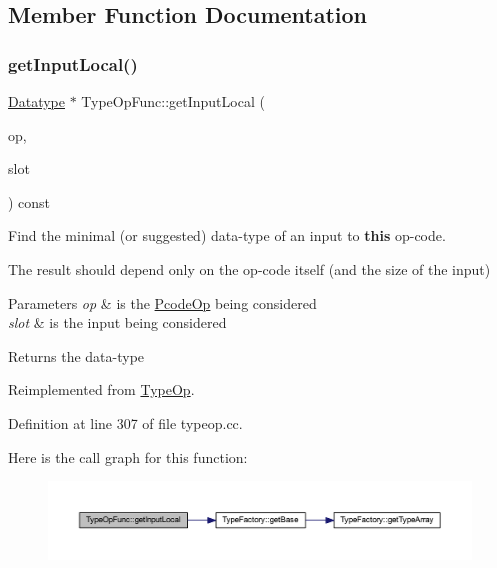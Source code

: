 \subsection{Member Function Documentation}
\mbox{\label{class_type_op_func_a7f2860d7c345a794c665f72dbc41c44d}} 
\subsubsection{\texorpdfstring{getInputLocal()}{getInputLocal()}}
{\footnotesize\ttfamily \mbox{\hyperlink{class_datatype}{Datatype}} $\ast$ Type\+Op\+Func\+::get\+Input\+Local (\begin{DoxyParamCaption}\item[{const \mbox{\hyperlink{class_pcode_op}{Pcode\+Op}} $\ast$}]{op,  }\item[{int4}]{slot }\end{DoxyParamCaption}) const\hspace{0.3cm}{\ttfamily [virtual]}}



Find the minimal (or suggested) data-\/type of an input to {\bfseries{this}} op-\/code. 

The result should depend only on the op-\/code itself (and the size of the input) 
\begin{DoxyParams}{Parameters}
{\em op} & is the \mbox{\hyperlink{class_pcode_op}{Pcode\+Op}} being considered \\
\hline
{\em slot} & is the input being considered \\
\hline
\end{DoxyParams}
\begin{DoxyReturn}{Returns}
the data-\/type 
\end{DoxyReturn}


Reimplemented from \mbox{\hyperlink{class_type_op_abe2e4b619932cf94bafb084963a0fc66}{Type\+Op}}.



Definition at line 307 of file typeop.\+cc.

Here is the call graph for this function\+:
\nopagebreak
\begin{figure}[H]
\begin{center}
\leavevmode
\includegraphics[width=350pt]{class_type_op_func_a7f2860d7c345a794c665f72dbc41c44d_cgraph}
\end{center}
\end{figure}
\mbox{\label{class_type_op_func_a279fd2e0aaf14e6a15bb12548cd3cc69}} 
